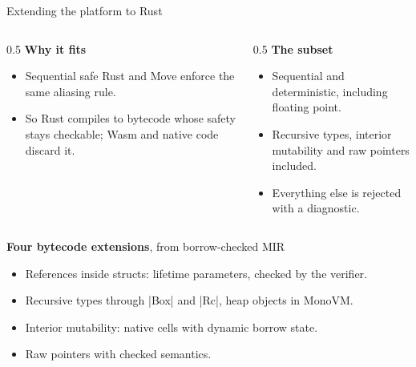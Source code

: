 \documentclass[aspectratio=169,11pt]{beamer}
\begin{document}
\begin{frame}[fragile]{Extending the platform to Rust}
  \begin{columns}[T]
    \begin{column}{0.5\textwidth}
      \textbf{Why it fits}
      \begin{itemize}\setlength{\itemsep}{4pt}
        \item Sequential safe Rust and Move enforce the same aliasing rule.
        \item So Rust compiles to bytecode whose safety stays checkable; Wasm and native code discard it.
      \end{itemize}
    \end{column}
    \begin{column}{0.5\textwidth}
      \textbf{The subset}
      \begin{itemize}\setlength{\itemsep}{4pt}
        \item Sequential and deterministic, including floating point.
        \item Recursive types, interior mutability and raw pointers included.
        \item Everything else is rejected with a diagnostic.
      \end{itemize}
    \end{column}
  \end{columns}
  \medskip
  \textbf{Four bytecode extensions}, from borrow-checked MIR
  \begin{itemize}\setlength{\itemsep}{2pt}\small
    \item References inside structs: lifetime parameters, checked by the verifier.
    \item Recursive types through |Box| and |Rc|, heap objects in MonoVM.
    \item Interior mutability: native cells with dynamic borrow state.
    \item Raw pointers with checked semantics.
  \end{itemize}
\end{frame}
\end{document}
